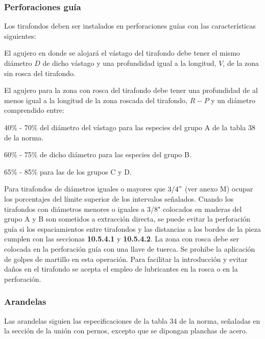 \subsubsection{Perforaciones guía}
Los tirafondos deben ser instalados en perforaciones guías con las características siguientes:
\begin{itemize*}
	\item El agujero en donde se alojará el vástago del tirafondo debe tener el mismo diámetro $D$ de dicho vástago y una profundidad igual a la longitud, $V$, de la zona sin rosca del tirafondo.
	\item El agujero para la zona con rosca del tirafondo debe tener una profundidad de al menos igual a la longitud de la zona roscada del tirafondo, $R-P$ y un diámetro comprendido entre:
	\begin{itemize*}
		\item 40\% - 70\% del diámetro del vástago para las especies del grupo A de la tabla 38 de la norma.
		\item 60\% - 75\% de dicho diámetro para las especies del grupo B.
		\item 65\% - 85\% para las de los grupos C y D.
	\end{itemize*}
\end{itemize*}
Para tirafondos de diámetros iguales o mayores que $3/4"$ (ver anexo M) ocupar los porcentajes del límite superior de los intervalos señalados. Cuando los tirafondos con diámetros menores o iguales a 3/8" colocados en maderas del grupo A y B son sometidos a extracción directa, se puede evitar la perforación guía si los espaciamientos entre tirafondos y las distancias a los bordes de la pieza cumplen con las seccionas \textbf{10.5.4.1} y \textbf{10.5.4.2}.
La zona con rosca debe ser colocada en la perforación guía con una llave de tuerca. Se prohibe la aplicación de golpes de martillo en esta operación. Para facilitar la introducción y evitar daños en el tirafondo se acepta el empleo de lubricantes en la rosca o en la perforación.

\subsubsection{Arandelas}
Las arandelas siguien las especificaciones de la tabla 34 de la norma, señaladas en la sección de la unión con pernos, excepto que se dipongan planchas de acero.

